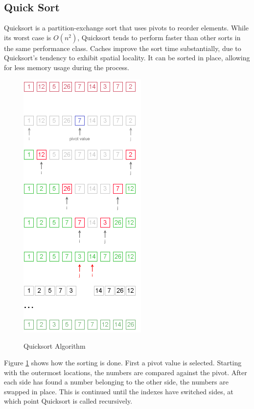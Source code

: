 \documentclass[journal]{IEEEtran}
\begin{document}
\subsection{Quick Sort}

Quicksort is a partition-exchange sort that uses pivots to reorder elements. While its worst case is $O(n^2)$, Quicksort tends to perform faster than other sorts in the same performance class. Caches improve the sort time substantially, due to Quicksort's tendency to exhibit spatial locality. It can be sorted in place, allowing for less memory usage during the process. 

\begin{figure}[f]
  \caption{Quicksort Algorithm}
  \centering
  \includegraphics[width=2.5in]{quick-sort.png}
  \label{fig:Quicksort Algorithm}
\end{figure}

Figure \ref{fig:Quicksort Algorithm} shows how the sorting is done. First a pivot value is selected.  Starting with the outermost locations, the numbers are compared against the pivot.  After each side has found a number belonging to the other side, the numbers are swapped in place. This is continued until the indexes have switched sides, at which point Quicksort is called recursively.
\end{document}
